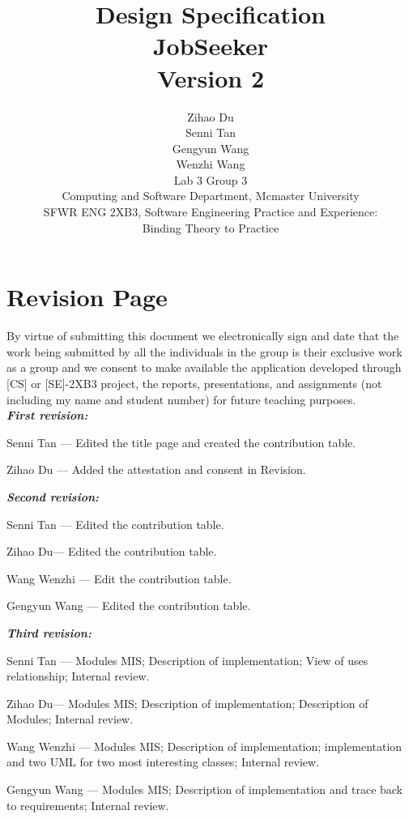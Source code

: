 \documentclass[12pt]{article}
\title{Design Specification \\ 
JobSeeker \\ 
\large Version 2}
\author{Zihao Du\\
Senni Tan\\
Gengyun Wang\\
Wenzhi Wang\\
Lab 3 Group 3\\
Computing and Software Department, Mcmaster University \\
SFWR ENG 2XB3, Software Engineering Practice and Experience:\\ Binding Theory to Practice\\
}
\begin{document}
\maketitle
\newpage

\section*{Revision Page}
\noindent By  virtue  of  submitting  this  document  we  electronically  sign  and  date  that  the  work  being  submitted  by  all  the individuals  in  the  group  is  their  exclusive  work  as  a  group  and  we  consent  to  make  available  the  application developed  through  [CS]  or  [SE]-2XB3  project,  the  reports,  presentations,  and  assignments  (not  including  my name and student number) for future teaching purposes.\\
\noindent \textbf{\emph{First revision:}}
\begin{description}
\item    Senni Tan --- Edited the title page and created the contribution table.
\item    Zihao Du --- Added the attestation and consent in Revision.
\end{description}
\noindent \textbf{\emph{Second revision:}}
\begin{description}
\item    Senni Tan --- Edited the contribution table.
\item    Zihao Du--- Edited the contribution table.
\item    Wang Wenzhi --- Edit the contribution table.
\item    Gengyun Wang --- Edited the contribution table.
\end{description}
\noindent \textbf{\emph{Third revision:}}
\begin{description}
\item    Senni Tan --- Modules MIS; Description of implementation; View of uses relationship; Internal review.
\item    Zihao Du--- Modules MIS; Description of implementation; Description of Modules; Internal review.
\item    Wang Wenzhi --- Modules MIS; Description of implementation; implementation and two UML for two most interesting classes; Internal review.
\item    Gengyun Wang --- Modules MIS; Description of implementation and trace back to requirements; Internal review.
\end{description}
\newpage
\end{document}
